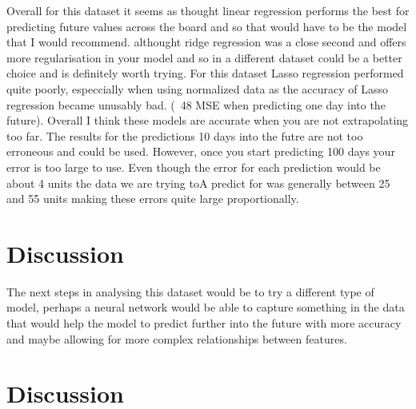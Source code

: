 \documentclass{report}
\begin{document}
Overall for this dataset it seems as thought linear regression performs the best for predicting future values across the board and so that would have to be the model that I would recommend. althought ridge regression was a close second and offers more regularisation in your model and so in a different dataset could be a better choice and is definitely worth trying.
For this dataset Lasso regression performed quite poorly, especcially when using normalized data as the accuracy of Lasso regression became unusably bad. (~48 MSE when predicting one day into the future).
Overall I think these models are accurate when you are not extrapolating too far. The results for the predictions 10 days into the futre are not too erroneous and could be used. However, once you start predicting 100 days your error is too large to use. Even though the error for each prediction would be about 4 units the data we are trying toA predict for was generally between 25 and 55 units making these errors quite large proportionally.

\section{Discussion}

The next steps in analysing this dataset would be to try a different type of model, perhaps a neural network would be able to capture something in the data that would help the model to predict further into the future with more accuracy and maybe allowing for more complex relationships between features.


\section{Discussion}
\end{document}
